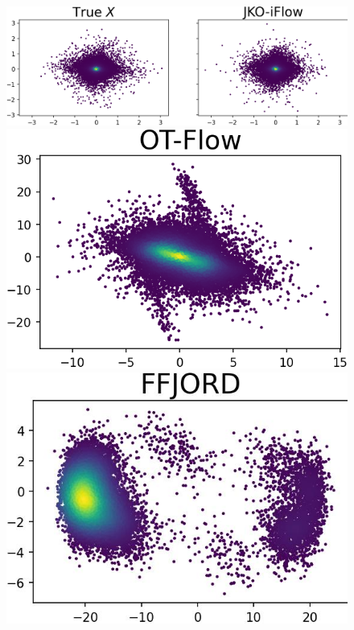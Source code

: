 \documentclass{article}
\theoremstyle{remark}
\theoremstyle{plain}
\begin{document}
{\begin{figure}[!t]
    \begin{minipage}{0.325\textwidth}
        \includegraphics[width=\linewidth]{bsds300_PCA_2D_compare.png}
    \end{minipage}
    \begin{minipage}{0.155\textwidth}
        \vspace{-0.2in}\includegraphics[width=\linewidth]{bsds300_PCA_2D_compare_OTFlow.png}
    \end{minipage}
    \begin{minipage}{0.15\textwidth}
        \vspace{-0.2in}\includegraphics[width=\linewidth]{bsds300_PCA_2D_compare_FFJORD.png}

\end{minipage}
\end{figure}}
\end{document}
